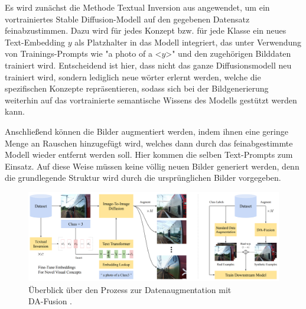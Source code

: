 
Es wird zunächst die Methode Textual Inversion aus \parencite{Gal2022textualinversion} angewendet, um ein vortrainiertes Stable Diffusion-Modell auf den gegebenen Datensatz feinabzustimmen. Dazu wird für jedes Konzept bzw. für jede Klasse ein neues Text-Embedding $y$ als Platzhalter in das Modell integriert, das unter Verwendung von Trainings-Prompts wie "a photo of a <$y$>" und den zugehörigen Bilddaten trainiert wird. Entscheidend ist hier, dass nicht das ganze Diffusionsmodell neu trainiert wird, sondern lediglich neue wörter erlernt werden, welche die spezifischen Konzepte repräsentieren, sodass sich bei der Bildgenerierung weiterhin auf das vortrainierte semantische Wissens des Modells gestützt werden kann.

Anschließend können die Bilder augmentiert werden, indem ihnen eine geringe Menge an Rauschen hinzugefügt wird, welches dann durch das feinabgestimmte Modell wieder entfernt werden soll. Hier kommen die selben Text-Prompts zum Einsatz. Auf diese Weise müssen keine völlig neuen Bilder generiert werden, denn die grundlegende Struktur wird durch die ursprünglichen Bilder vorgegeben.

\begin{figure}
	\centering
	\includegraphics[width=\textwidth]{figure_da-fusion_architecture.png}
	\caption[Überblick über den Prozess zur Datenaugmentation mit DA-Fusion.]{Überblick über den Prozess zur Datenaugmentation mit\\
	DA-Fusion \parencite{Trabucco2023dafusion}.}
	\label{fig:da-fusion-process}
\end{figure}

